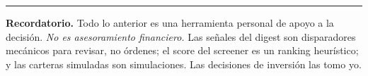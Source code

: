 \documentclass[11pt,a4paper]{article}
\begin{document}
\vspace{0.4cm}
\noindent\rule{\textwidth}{0.4pt}

\small
\textbf{Recordatorio.} Todo lo anterior es una herramienta personal de apoyo a la
decisi\'on. \emph{No es asesoramiento financiero.} Las se\~nales del digest son
disparadores mec\'anicos para revisar, no \'ordenes; el score del screener es un
ranking heur\'istico; y las carteras simuladas son simulaciones. Las decisiones de
inversi\'on las tomo yo.
\normalsize
\end{document}
